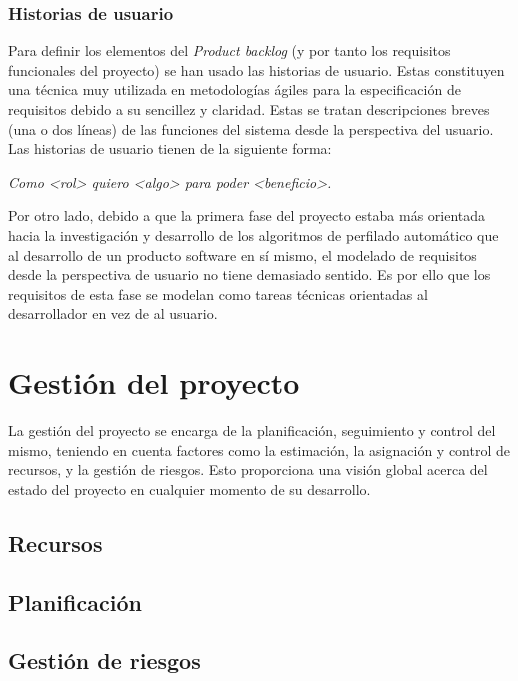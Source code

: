 \subsubsection{Historias de usuario}
Para definir los elementos del \textit{Product backlog} (y por tanto los requisitos funcionales del proyecto) se han usado las historias de usuario. Estas constituyen una técnica muy utilizada en metodologías ágiles para la especificación de requisitos debido a su sencillez y claridad. Estas se tratan descripciones breves (una o dos líneas) de las funciones del sistema desde la perspectiva del usuario. Las historias de usuario tienen de la siguiente forma:
\begin{center}
     \textit{Como <rol> quiero <algo> para poder <beneficio>.}
\end{center}

Por otro lado, debido a que la primera fase del proyecto estaba más orientada hacia la investigación y desarrollo de los algoritmos de perfilado automático que al desarrollo de un producto software en sí mismo, el modelado de requisitos desde la perspectiva de usuario no tiene demasiado sentido. Es por ello que los requisitos de esta fase se modelan como tareas técnicas orientadas al desarrollador en vez de al usuario.%

\section{Gestión del proyecto}
La gestión del proyecto se encarga de la planificación, seguimiento y control del mismo, teniendo en cuenta factores como la estimación, la asignación y control de recursos, y la gestión de riesgos. Esto proporciona una visión global acerca del estado del proyecto en cualquier momento de su desarrollo.
\subsection{Recursos}
\subsection{Planificación}
\subsection{Gestión de riesgos}
